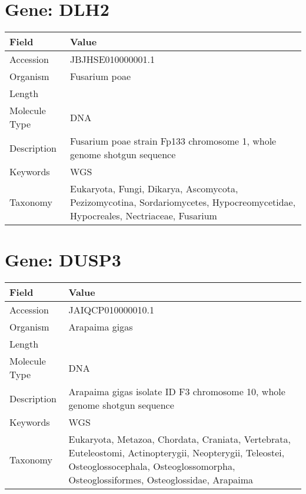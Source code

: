 \documentclass[10pt]{article}
\begin{document}
\section*{Gene: DLH2}
{\footnotesize
\begin{longtable}{>{\raggedright\arraybackslash}p{4.5cm} >{\raggedright\arraybackslash}p{11.5cm}}
\textbf{Field} & \textbf{Value} \\
\hline
Accession & JBJHSE010000001.1 \\
Organism & Fusarium poae \\
Length & 12048428 \\
Molecule Type & DNA \\
Description & Fusarium poae strain Fp133 chromosome 1, whole genome shotgun sequence \\
Keywords & WGS \\
Taxonomy & Eukaryota, Fungi, Dikarya, Ascomycota, Pezizomycotina, Sordariomycetes, Hypocreomycetidae, Hypocreales, Nectriaceae, Fusarium \\
\end{longtable}
}


\section*{Gene: DUSP3}
{\footnotesize
\begin{longtable}{>{\raggedright\arraybackslash}p{4.5cm} >{\raggedright\arraybackslash}p{11.5cm}}
\textbf{Field} & \textbf{Value} \\
\hline
Accession & JAIQCP010000010.1 \\
Organism & Arapaima gigas \\
Length & 26053404 \\
Molecule Type & DNA \\
Description & Arapaima gigas isolate ID F3 chromosome 10, whole genome shotgun sequence \\
Keywords & WGS \\
Taxonomy & Eukaryota, Metazoa, Chordata, Craniata, Vertebrata, Euteleostomi, Actinopterygii, Neopterygii, Teleostei, Osteoglossocephala, Osteoglossomorpha, Osteoglossiformes, Osteoglossidae, Arapaima \\
\end{longtable}
}
\end{document}
